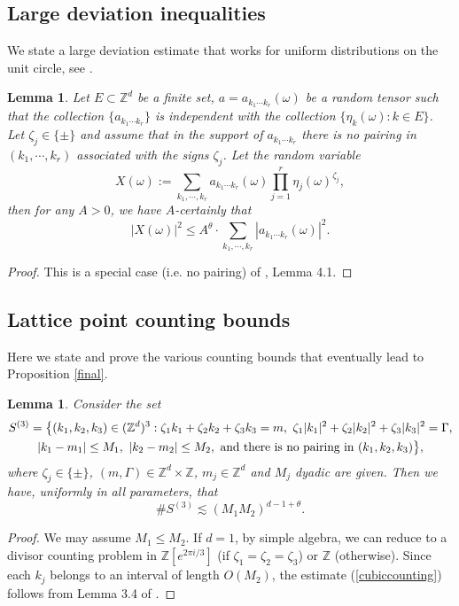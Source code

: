 \documentclass[11 pt,reqno]{amsart}
\newtheorem{lem}[thm]{Lemma}
\theoremstyle{definition}
\theoremstyle{remark}
\numberwithin{equation}{section}
\newcommand{\Zb}{\mathbb{Z}}
\begin{document}
{ \subsection{Large deviation inequalities}\label{section4.2} We state a large deviation estimate that works for uniform distributions on the unit circle, see \cite{DNY}.
 \begin{lem}\label{largedev0} Let $E\subset \Zb^d$ be a finite set, $a=a_{k_1\cdots k_r}(\omega)$ be a random tensor such that the collection $\{a_{k_1\cdots k_r}\}$ is independent with the collection $\{\eta_k(\omega):k\in E\}$. Let $\zeta_j\in\{\pm\}$ and assume that in the support of $a_{k_1\cdots k_r}$ there is no pairing in $(k_1,\cdots,k_r)$ associated with the signs $\zeta_j$. Let the random variable
 \begin{equation}\label{largedev1}X(\omega):=\sum_{k_1,\cdots,k_r}a_{k_1\cdots k_r}(\omega)\prod_{j=1}^r\eta_j(\omega)^{\zeta_j},
 \end{equation} then for any $A>0$, we have $A$-certainly that
 \begin{equation}\label{largedev2}|X(\omega)|^2\leq A^\theta\cdot\sum_{k_1,\cdots,k_r}|a_{k_1\cdots k_r}(\omega)|^2.
 \end{equation}
 \end{lem}
 \begin{proof} This is a special case (i.e. no pairing) of \cite{DNY}, Lemma 4.1.
 \end{proof}
 \subsection{Lattice point counting bounds}\label{counting} Here we state and prove the various counting bounds that eventually lead to Proposition \ref{final}.
 \begin{lem}\label{cubic} Consider the set
 \begin{multline}S^{(3)}=\big\{(k_1,k_2,k_3)\in(\Zb^d)^3:\zeta_1k_1+\zeta_2k_2+\zeta_3k_3=m,\,\,\zeta_1|k_1|^2+\zeta_2|k_2|^2+\zeta_3|k_3|^2=\Gamma,
 \\|k_1-m_1|\leq M_1,\,\,|k_2-m_2|\leq M_2,\,\,\text{\rm{and there is no pairing in $(k_1,k_2,k_3)$}}\big\},
 \end{multline} where $\zeta_j\in\{\pm\}$, $(m,\Gamma)\in\Zb^d\times\Zb$, $m_j\in\Zb^d$ and $M_j$ dyadic are given. Then we have, uniformly in all parameters, that
 \begin{equation}\label{cubiccounting}\#S^{(3)}\lesssim (M_1M_2)^{d-1+\theta}.
 \end{equation}
 \end{lem}
 \begin{proof} We may assume $M_1\leq M_2$. If $d=1$, by simple algebra, we can reduce to a divisor counting problem in $\Zb[e^{2\pi i/3}]$ (if $\zeta_1=\zeta_2=\zeta_3$) or $\Zb$ (otherwise). Since each $k_j$ belongs to an interval of length $O(M_2)$, the estimate (\ref{cubiccounting}) follows from Lemma 3.4 of \cite{DNY0}.
 

\end{proof}}
\end{document}

